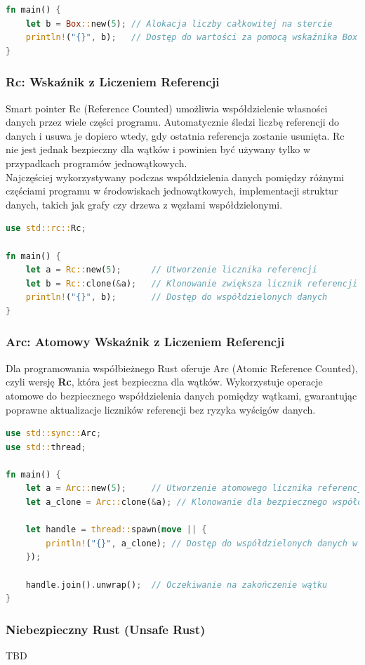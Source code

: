 \begin{lstlisting}[language=Rust, caption=Box smart pointer, label=box_smart_pointer]
fn main() {
    let b = Box::new(5); // Alokacja liczby całkowitej na stercie
    println!("{}", b);   // Dostęp do wartości za pomocą wskaźnika Box
}
\end{lstlisting}

\subsubsection{Rc: Wskaźnik z Liczeniem Referencji}
\label{RC}
Smart pointer Rc (Reference Counted) umożliwia współdzielenie własności danych przez wiele części programu. Automatycznie śledzi liczbę referencji do danych i usuwa je dopiero wtedy, gdy ostatnia referencja zostanie usunięta. Rc nie jest jednak bezpieczny dla wątków i powinien być używany tylko w przypadkach programów jednowątkowych.\\
Najczęściej wykorzystywany podczas współdzielenia danych pomiędzy różnymi częściami programu w środowiskach jednowątkowych, implementacji struktur danych, takich jak grafy czy drzewa z węzłami współdzielonymi.

\begin{lstlisting}[language=Rust, caption=Rc smart pointer, label=rc_smart_pointer]
use std::rc::Rc;

fn main() {
    let a = Rc::new(5);      // Utworzenie licznika referencji
    let b = Rc::clone(&a);   // Klonowanie zwiększa licznik referencji
    println!("{}", b);       // Dostęp do współdzielonych danych
}
\end{lstlisting}

\subsubsection{Arc: Atomowy Wskaźnik z Liczeniem Referencji}
\label{ARC}
Dla programowania współbieżnego Rust oferuje Arc (Atomic Reference Counted), czyli wersję \textbf{Rc}, która jest bezpieczna dla wątków. Wykorzystuje operacje atomowe do bezpiecznego współdzielenia danych pomiędzy wątkami, gwarantując poprawne aktualizacje liczników referencji bez ryzyka wyścigów danych.

\begin{lstlisting}[language=Rust, caption=Arc smart pointer, label=arc_smart_pointer]
use std::sync::Arc;
use std::thread;

fn main() {
    let a = Arc::new(5);     // Utworzenie atomowego licznika referencji
    let a_clone = Arc::clone(&a); // Klonowanie dla bezpiecznego współdzielenia

    let handle = thread::spawn(move || {
        println!("{}", a_clone); // Dostęp do współdzielonych danych w nowym wątku
    });

    handle.join().unwrap();  // Oczekiwanie na zakończenie wątku
}
\end{lstlisting}
\subsubsection{Niebezpieczny Rust (Unsafe Rust)}
TBD \cite{UnsafeRust}




